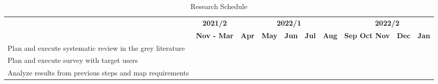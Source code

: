 \begin{table}[!htb]
  \centering
  \caption{Research Schedule}
  \label{tbl:schedule}
  \scriptsize
  \begin{tabular}{p{4cm}|l|lllll|lll}
    \bottomrule
    \rowcolor[rgb]{0.753,0.753,0.753} \multicolumn{1}{c|}{{\cellcolor[rgb]{0.753,0.753,0.753}}}                                       & \multicolumn{1}{c|}{\textbf{2021/2}} & \multicolumn{5}{c|}{\textbf{2022/1}} & \multicolumn{3}{c|}{\textbf{2022/2}}                                                                                                                                                                                                                                           \\
    \hhline{>{\arrayrulecolor[rgb]{0.753,0.753,0.753}}->{\arrayrulecolor{black}}---------|}
    \rowcolor[rgb]{0.753,0.753,0.753} \multicolumn{1}{c|}{\multirow{-2}{*}{{\cellcolor[rgb]{0.753,0.753,0.753}}\textbf{ Activities}}} & \textbf{Nov - Mar}                   & \multicolumn{1}{c}{\textbf{Apr}}     & \textbf{May}                         & \textbf{Jun}                         & \multicolumn{1}{l}{\textbf{Jul}}     & \textbf{Aug}                         & \textbf{Sep Oct Nov}                 & \textbf{Dec}                         & \multicolumn{1}{c|}{\textbf{Jan}}    \\
    \hline
    \rowcolor[rgb]{0.914,0.914,0.914} Plan and execute systematic review in the grey literature                                       & {\cellcolor[rgb]{0.753,0.753,0.753}} &                                      &                                      &                                      &                                      &                                      &                                      &                                      &                                      \\
    Plan and execute survey with target users                                                                                         &                                      & {\cellcolor[rgb]{0.753,0.753,0.753}} &                                      &                                      &                                      &                                      &                                      &                                      &                                      \\
    \rowcolor[rgb]{0.914,0.914,0.914} Analyze results from previous steps and map requirements                                        &                                      & {\cellcolor[rgb]{0.753,0.753,0.753}} & {\cellcolor[rgb]{0.753,0.753,0.753}} &                                      &                                      &                                      &                                      &                                      &                                      \\

\end{tabular}
\end{table}
